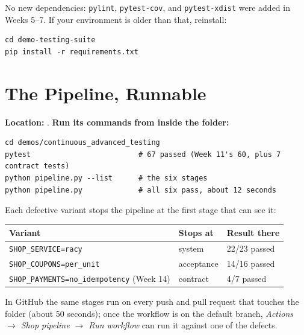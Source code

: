\documentclass[11pt]{article}
\begin{document}
\begin{tipbox}
No new dependencies: \texttt{pylint}, \texttt{pytest-cov}, and
\texttt{pytest-xdist} were added in Weeks 5--7. If your environment is
older than that, reinstall:
\begin{lstlisting}[style=shellstyle]
cd demo-testing-suite
pip install -r requirements.txt
\end{lstlisting}
\end{tipbox}

\section{The Pipeline, Runnable}
\textbf{Location:} . \textbf{Run
its commands from inside the folder:}
\begin{lstlisting}[style=shellstyle]
cd demos/continuous_advanced_testing
pytest                         # 67 passed (Week 11's 60, plus 7 contract tests)
python pipeline.py --list      # the six stages
python pipeline.py             # all six pass, about 12 seconds
\end{lstlisting}

Each defective variant stops the pipeline at the first stage that can
see it:

\begin{center}
\small
\begin{tabular}{@{}lll@{}}
\toprule
\textbf{Variant} & \textbf{Stops at} & \textbf{Result there}\\
\midrule
\texttt{SHOP\_SERVICE=racy} & system & 22/23 passed\\
\texttt{SHOP\_COUPONS=per\_unit} & acceptance & 14/16 passed\\
\texttt{SHOP\_PAYMENTS=no\_idempotency} (Week 14) & contract & 4/7 passed\\
\bottomrule
\end{tabular}
\end{center}

In GitHub the same stages run on every push and pull request that
touches the folder (about 50 seconds); once the workflow is on the
default branch, \emph{Actions $\rightarrow$ Shop pipeline $\rightarrow$
Run workflow} can run it against one of the defects.

\end{document}
